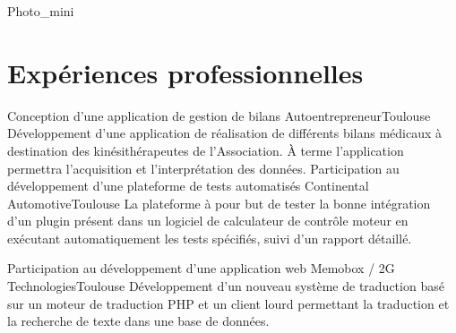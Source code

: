 \documentclass{my_cv_bis}
\begin{document}
 {
}{Photo_mini}

%


 
 \vspace{-5mm}
\section{Expériences professionnelles}
	{Conception d’une application de gestion de bilans}
	{Autoentrepreneur}{Toulouse}
	{
	Développement d'une application de réalisation de différents bilans médicaux à destination des kinésithérapeutes 
	de l'Association. À terme l'application permettra l'acquisition et l'interprétation des données.
	}
	{}
	{Participation au développement d'une plateforme de tests automatisés}
	{Continental Automotive}{Toulouse}
	{
	La plateforme à pour but de tester la bonne intégration d'un plugin présent dans un logiciel de calculateur de contrôle moteur en exécutant
	automatiquement les tests spécifiés, suivi d'un rapport détaillé.
	}
	{}

	{ Participation au développement d'une application web}
	{Memobox / 2G Technologies}{Toulouse}
	{Développement d'un nouveau système de traduction basé sur un moteur de traduction PHP et un client lourd
	permettant la traduction et la recherche de texte dans une base de données.  } {}
\end{document}
